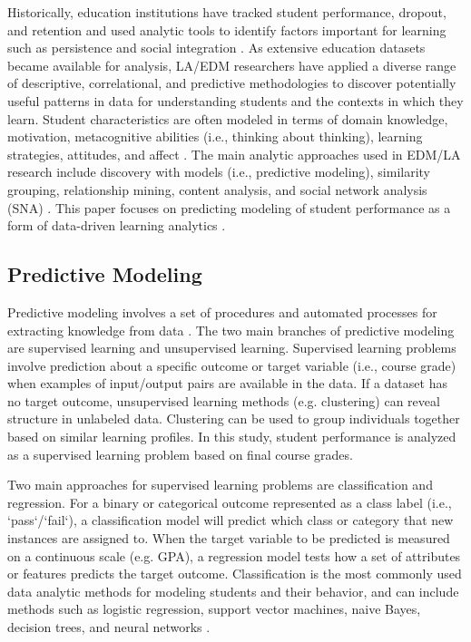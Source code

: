 \documentclass[sigconf]{acmart}
\begin{document}
Historically, education institutions have tracked student performance, 
dropout, and retention and used analytic tools to identify factors important 
for learning such as persistence and social integration \cite{ferguson12}. 
As extensive education datasets became available for analysis, LA/EDM 
researchers have applied a diverse range of descriptive, correlational, and 
predictive methodologies to discover potentially useful patterns in data for 
understanding students and the contexts in which they learn. Student 
characteristics are often modeled in terms of domain knowledge, motivation, 
metacognitive abilities (i.e., thinking about thinking), learning strategies, 
attitudes, and affect \cite{papamitsiou14}. The main analytic approaches used 
in EDM/LA research include discovery with models (i.e., predictive modeling), 
similarity grouping, relationship mining, content analysis, and social network 
analysis (SNA) \cite{baker09}. This paper focuses on predicting modeling of
student performance as a form of data-driven learning analytics
\cite{verbert12}. 


\subsection{Predictive Modeling}

Predictive modeling involves a set of procedures and automated processes for 
extracting knowledge from data \cite{jamesetal13, kuhn13}. The two main 
branches of predictive modeling are supervised learning and unsupervised 
learning. Supervised learning problems involve prediction about a specific 
outcome or target variable (i.e., course grade) when examples of input/output 
pairs are available in the data. If a dataset has no target outcome, 
unsupervised learning methods (e.g. clustering) can reveal structure in 
unlabeled data. Clustering can be used to group individuals together based 
on similar learning profiles. In this study, student performance is analyzed
as a supervised learning problem based on final course grades. 


Two main approaches for supervised learning problems are classification and 
regression. For a binary or categorical outcome represented as a class label 
(i.e., `pass`/`fail`), a classification model will predict which class or 
category that new instances are assigned to. When the target variable to be 
predicted is measured on a continuous scale (e.g. GPA), a regression model 
tests how a set of attributes or features predicts the target outcome. 
Classification is the most commonly used data analytic methods for modeling 
students and their behavior, and can include methods such as logistic 
regression, support vector machines, naive Bayes, decision trees, and 
neural networks \cite{Lykourentzou09}. 
\end{document}
